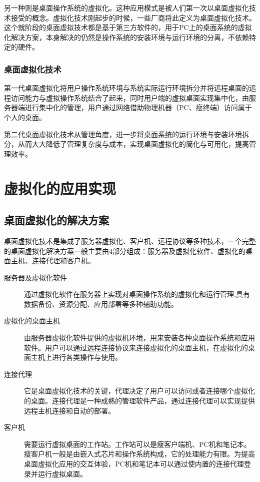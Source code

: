 \documentclass[10pt,a4paper]{article}
\begin{document}
\begin{CJK*}{UTF8}{gkai}
另一种则是桌面操作系统的虚拟化。这种应用模式是被人们第一次以桌面虚拟化技术接受的概念。虚拟化技术刚起步的时候，一些厂商将此定义为桌面虚拟化技术。这个就阶段的桌面虚拟技术都是基于第三方软件的，用于PC上的桌面系统的虚拟化解决方案，本身解决的仍然是操作系统的安装环境与运行环境的分离，不依赖特定的硬件\cite{4}。


\subsubsection{桌面虚拟化技术}
第一代桌面虚拟化将用户操作系统环境与系统实际运行环境拆分并将远程桌面的远程访问能力与虚拟操作系统结合了起来，同时用户端的虚拟桌面实现集中化，由服务器端进行集中化的管理，用户通过网络借助物理机器（PC、瘦终端）访问属于个人的桌面。


第二代桌面虚拟化技术从管理角度，进一步将桌面系统的运行环境与安装环境拆分，从而大大降低了管理复杂度与成本，实现桌面虚拟化的简化与可用化，提高管理效率。


\section{虚拟化的应用实现}
\subsection{桌面虚拟化的解决方案}
桌面虚拟化技术是集成了服务器虚拟化、客户机、远程协议等多种技术，一个完整的桌面虚拟化解决方案一般主要由4部分组成：服务器及虚拟化软件、虚拟化的桌面主机、连接代理和客户机\cite{5}。
\begin{description}
\item[服务器及虚拟化软件]	通过虚拟化软件在服务器上实现对桌面操作系统的虚拟化和运行管理,具有数据备份、资源分配、应用部署等多种辅助功能。
\item[虚拟化的桌面主机]		由服务器虚拟化软件提供的虚拟机环境，用来安装各种桌面操作系统和应用软件。用户可以通过远程连接协议来连接虚拟化的桌面主机，在虚拟化的桌面主机上进行各类操作与使用。
\item[连接代理]	它是桌面虚拟化技术的关键，代理决定了用户可以访问或者连接哪个虚拟化的桌面。连接代理是一种成熟的管理软件产品，通过连接代理可以实现提供远程主机连接和自动的部署。
\item[客户机]		需要运行虚拟桌面的工作站。工作站可以是瘦客户端机、PC机和笔记本。瘦客户机一般是由嵌入式芯片和操作系统构成，它的处理能力有限。为提高桌面虚拟化应用的交互体验，PC机和笔记本可以通过使内置的连接代理登录并运行虚拟桌面。
\end{description}



\end{CJK*}
\end{document}
